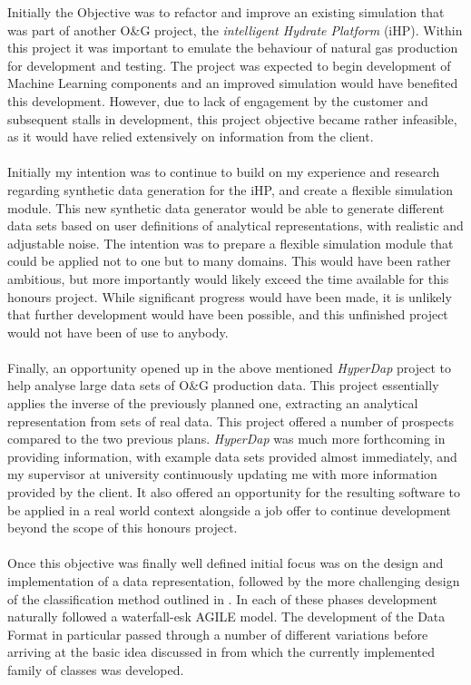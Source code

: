 \documentclass[main.tex]{subfiles}
\begin{document}
    Initially the Objective was to refactor and improve an existing simulation that was part of another O\&G  project, the \textit{intelligent Hydrate Platform} (iHP). Within this project it was important to emulate the behaviour of natural gas production for development and testing. The project was expected to begin development of Machine Learning components and an improved simulation would have benefited this development. However, due to lack of engagement by the customer and subsequent stalls in development, this project objective became rather infeasible, as it would have relied extensively on information from the client.
    \\\\
    Initially my intention was to continue to build on my experience and research regarding synthetic data generation for the iHP, and create a flexible simulation module. This new synthetic data generator would be able to generate different data sets based on user definitions of analytical representations, with realistic and adjustable noise. The intention was to prepare a flexible simulation module that could be applied not to one but to many domains. This would have been rather ambitious, but more importantly would likely exceed the time available for this honours project. While significant progress would have been made, it is unlikely that further development would have been possible, and this unfinished project would not have been of use to anybody.
    \\\\
    Finally, an opportunity opened up in the above mentioned \textit{HyperDap} project to help analyse large data sets of O\&G production data. This project essentially applies the inverse of the previously planned one, extracting an analytical representation from sets of real data. This project offered a number of prospects compared to the two previous plans. \textit{HyperDap} was much more forthcoming in providing information, with example data sets provided almost immediately, and my supervisor at university continuously updating me with more information provided by the client. It also offered an opportunity for the resulting software to be applied in a real world context alongside a job offer to continue development beyond the scope of this honours project.
    \\\\
    Once this objective was finally well defined initial focus was on the design and implementation of a data representation, followed by the more challenging design of the classification method outlined in . In each of these phases development naturally followed a waterfall-esk AGILE model. The development of the Data Format in particular passed through a number of different variations before arriving at the basic idea discussed in  from which the currently implemented family of classes was developed.
    
\end{document}
